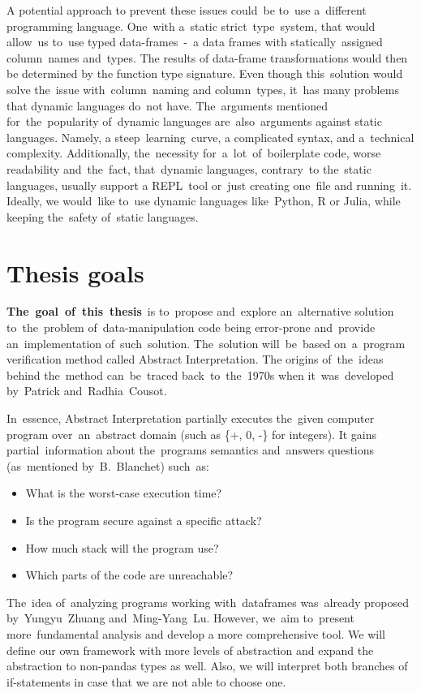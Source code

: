 A potential approach to prevent these issues could~be to~use a~different programming language.
One~with a~static strict~type~system, that would allow~us to~use typed data-frames~-~a data frames with statically~assigned
column~names and~types.
The results of data-frame transformations would then be determined by the function type signature.
Even though this~solution would solve the~issue with~column~naming and column~types, it~has many problems that dynamic
languages do~not have.
The~arguments mentioned for~the~popularity of~dynamic languages are~also~arguments against static languages.
Namely, a steep~learning~curve, a complicated syntax, and a~technical complexity.
Additionally, the~necessity for~a~lot~of~boilerplate code, worse readability and~the~fact, that~dynamic languages,
contrary~to the~static languages, usually support a REPL~tool or~just creating one~file and running~it.
Ideally, we would~like to~use dynamic languages like~Python, R or Julia, while keeping the~safety of~static languages.

\section*{Thesis goals}
\textbf{The~goal~of~this~thesis}~is to~propose and~explore an~alternative solution to~the~problem of~data-manipulation
code being error-prone and~provide an~implementation of~such~solution.
The~solution will~be~based on~a~program verification method called Abstract Interpretation.
The origins of~the~ideas behind the~method can~be~traced back~to~the~1970s when it~was~developed by~Patrick
and~Radhia~Cousot\cite{Cousot:1977:AI}.

In~essence, Abstract Interpretation partially executes the~given computer program over~an~abstract domain
(such as \{+, 0, -\} for integers).
It gains partial~information about the~programs semantics and~answers questions (as~mentioned
by~B.~Blanchet\cite{Blanchet:2002:AI}) such~as:
\begin{itemize}
    \item What is the worst-case execution time?
    \item Is the program secure against a specific attack?
    \item How much stack will the program use?
    \item Which parts of the code are unreachable?
\end{itemize}

The~idea of~analyzing programs working with~dataframes was~already proposed by~Yungyu~Zhuang
and~Ming-Yang~Lu\cite{Zhuang:2022:TypeChecking}.
However, we~aim to~present more~fundamental analysis and develop a more comprehensive tool.
We will define our own framework with more levels of abstraction and expand the abstraction to non-pandas types as well.
Also, we will interpret both branches of if-statements in case that we are not able to choose one.

